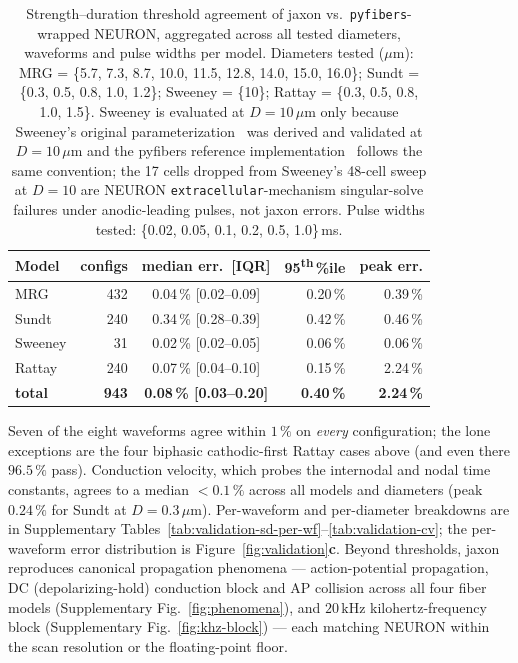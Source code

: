 \begin{table}[h]
  \centering
  \caption{Strength--duration threshold agreement of jaxon vs.\
    \texttt{pyfibers}-wrapped NEURON, aggregated across all tested
    diameters, waveforms and pulse widths per model.
    Diameters tested ($\mu$m):
    MRG = \{5.7, 7.3, 8.7, 10.0, 11.5, 12.8, 14.0, 15.0, 16.0\};
    Sundt = \{0.3, 0.5, 0.8, 1.0, 1.2\};
    Sweeney = \{10\};
    Rattay = \{0.3, 0.5, 0.8, 1.0, 1.5\}.
    Sweeney is evaluated at $D=10\,\mu\mathrm{m}$ only because Sweeney's
    original parameterization~\cite{sweeney1987} was derived and
    validated at $D=10\,\mu\mathrm{m}$ and the pyfibers reference
    implementation~\cite{marshall2025pyfibers} follows the same convention;
    the 17 cells dropped from Sweeney's 48-cell sweep at $D=10$ are
    NEURON \texttt{extracellular}-mechanism singular-solve failures
    under anodic-leading pulses, not jaxon errors.
    Pulse widths tested: \{0.02, 0.05, 0.1, 0.2, 0.5, 1.0\}\,ms.}
  \label{tab:validation-sd}
  \small
  \begin{tabular}{lrcrr}
    \toprule
    Model    & configs & median err.\ [IQR] & 95\textsuperscript{th}\,\%ile & peak err. \\
    \midrule
    MRG      &  432 & 0.04\,\% [0.02--0.09] & 0.20\,\% & 0.39\,\% \\
    Sundt    &  240 & 0.34\,\% [0.28--0.39] & 0.42\,\% & 0.46\,\% \\
    Sweeney  &   31 & 0.02\,\% [0.02--0.05] & 0.06\,\% & 0.06\,\% \\
    Rattay   &  240 & 0.07\,\% [0.04--0.10] & 0.15\,\% & 2.24\,\% \\
    \midrule
    \textbf{total} & \textbf{943} & \textbf{0.08\,\% [0.03--0.20]} & \textbf{0.40\,\%} & \textbf{2.24\,\%} \\
    \bottomrule
  \end{tabular}
\end{table}

Seven of the eight waveforms agree within $1\,\%$ on \emph{every}
configuration; the lone exceptions are the four biphasic cathodic-first
Rattay cases above (and even there $96.5\,\%$ pass).  Conduction
velocity, which probes the internodal and nodal time constants, agrees
to a median $<0.1\,\%$ across all models and diameters (peak $0.24\,\%$
for Sundt at $D=0.3\,\mu\mathrm{m}$).  Per-waveform and per-diameter
breakdowns are in Supplementary
Tables~\ref{tab:validation-sd-per-wf}--\ref{tab:validation-cv}; the
per-waveform error distribution is Figure~\ref{fig:validation}\textbf{c}.
Beyond thresholds, jaxon reproduces canonical propagation phenomena ---
action-potential propagation, DC (depolarizing-hold) conduction block
and AP collision across all four fiber models
(Supplementary Fig.~\ref{fig:phenomena}), and $20\,\mathrm{kHz}$
kilohertz-frequency block (Supplementary Fig.~\ref{fig:khz-block}) ---
each matching NEURON within the scan resolution or the floating-point
floor.

